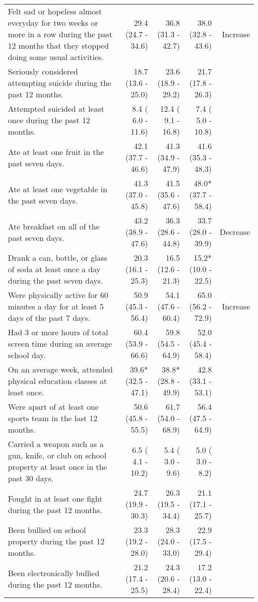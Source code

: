 \documentclass[11pt]{article}
\begin{document}
\begin{longtable}{p{12cm}|rrr|r}
  Felt sad or hopeless almost everyday for two weeks or more in a row during the past 12 months that they stopped doing some usual activities. & 29.4 (24.7 - 34.6) & 36.8 (31.3 - 42.7) & 38.0 (32.8 - 43.6) & Increase \\ 
  Seriously considered attempting suicide during the past 12 months. & 18.7 (13.6 - 25.0) & 23.6 (18.9 - 29.2) & 21.7 (17.8 - 26.3) &  \\ 
  Attempted suicided at least once during the past 12 months. &  8.4 ( 6.0 - 11.6) & 12.4 ( 9.1 - 16.8) &  7.4 ( 5.0 - 10.8) &  \\ 
  Ate at least one fruit in the past seven days.  & 42.1 (37.7 - 46.6) & 41.3 (34.9 - 47.9) & 41.6 (35.3 - 48.3) &  \\ 
  Ate at least one vegetable in the past seven days.  & 41.3 (37.0 - 45.8) & 41.5 (35.6 - 47.6) & 48.0*(37.7 - 58.4) &  \\ 
  Ate breakfast on all of the past seven days. & 43.2 (38.9 - 47.6) & 36.3 (28.6 - 44.8) & 33.7 (28.0 - 39.9) & Decrease \\ 
  Drank a can, bottle, or glass of soda at least once a day during the past seven days. & 20.3 (16.1 - 25.3) & 16.5 (12.6 - 21.3) & 15.2*(10.0 - 22.5) &  \\ 
  Were physically active for 60 minutes a day for at least 5 days of the past 7 days. & 50.9 (45.3 - 56.4) & 54.1 (47.6 - 60.4) & 65.0 (56.2 - 72.9) & Increase \\ 
  Had 3 or more hours of total screen time during an average school day. & 60.4 (53.9 - 66.6) & 59.8 (54.5 - 64.9) & 52.0 (45.4 - 58.4) &  \\ 
  On an average week, attended physical education classes at least once. & 39.6*(32.5 - 47.1) & 38.8*(28.8 - 49.9) & 42.8 (33.1 - 53.1) &  \\ 
  Were apart of at least one sports team in the last 12 months. & 50.6 (45.8 - 55.5) & 61.7 (54.0 - 68.9) & 56.4 (47.5 - 64.9) &  \\ 
  Carried a weapon such as a gun, knife, or club on school property at least once in the past 30 days. &  6.5 ( 4.1 - 10.2) &  5.4 ( 3.0 -  9.6) &  5.0 ( 3.0 -  8.2) &  \\ 
  Fought in at least one fight during the past 12 months. & 24.7 (19.9 - 30.3) & 26.3 (19.5 - 34.4) & 21.1 (17.1 - 25.7) &  \\ 
  Been bullied on school property during the past 12 months. & 23.3 (19.2 - 28.0) & 28.3 (24.0 - 33.0) & 22.9 (17.5 - 29.4) &  \\ 
  Been electronically bullied during the past 12 months. & 21.2 (17.4 - 25.5) & 24.3 (20.6 - 28.4) & 17.2 (13.0 - 22.4) &  \\ 

\end{longtable}
\end{document}
